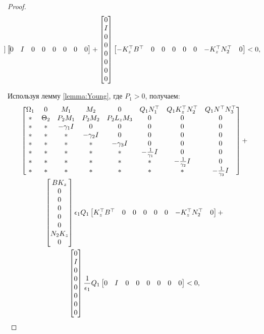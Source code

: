 \begin{proof}
\begin{multline}
\begin{bmatrix}
	\end{bmatrix}
	\begin{bmatrix}
		0 & I & 0&0&0&0&0&0
	\end{bmatrix}
	+
	\begin{bmatrix}
		0 \\I\\0\\0\\0\\0\\0\\0
	\end{bmatrix}
	\begin{bmatrix}
		-K_z^\top B^\top & 0 & 0&0&0&0&-{K}_z^\top{N}_2^\top&0
	\end{bmatrix}
	<0,
	\end{multline}
	
	Используя лемму \ref{lemma:Young}, где $P_1>0$, получаем:
	\begin{multline}
		\label{eq:after_Young}
		\begin{bmatrix}
			{\Omega}_1 & 0 & {M}_1 & {M}_2 & 0& {Q}_1{N}_1^\top & {Q}_1{K}_z^\top{N}_2^\top & {Q}_1 {N}^\top{N}_3^\top 
			\\
			* & {\Theta}_2 & {P}_2{M}_1 & {P}_2{M}_2 & {P}_2{L}_z{M}_3 & 0 & 0 & 0\\
			* & * & -\gamma_1{I} & 0&0&0&0&0\\
			* & * & * & -\gamma_2{I}&0&0&0&0\\
			* & * & * & *&-\gamma_3{I}&0&0&0\\
			* & * & * & *&*&-\frac{1}{\gamma_1}{I}&0&0\\
			* & * & * & *&*&*&-\frac{1}{\gamma_2}{I}&0\\
			*&* & * & * & *&*&*&-\frac{1}{\gamma_3}{I}
		\end{bmatrix}
		+
		\\
		\begin{bmatrix}
			B K_z \\0\\0\\0\\0\\0\\N_2 K_z\\0
		\end{bmatrix}
		\epsilon_1 Q_1
		\begin{bmatrix}
			K_z^\top B^\top & 0 & 0&0&0&0&-{K}_z^\top{N}_2^\top&0
		\end{bmatrix}
		+
		\\
		\begin{bmatrix}
			0 \\I\\0\\0\\0\\0\\0\\0
		\end{bmatrix}
		\frac{1}{\epsilon_1}{Q}_1
		\begin{bmatrix}
			0 & I & 0&0&0&0&0&0
		\end{bmatrix}
		<0,
	\end{multline}
	

\end{proof}
